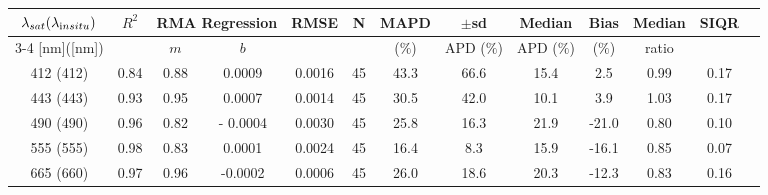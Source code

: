 \documentclass[preview]{standalone}
\begin{document}
\tiny

\tiny
\centering
\begin{tabular}{ccccccccccccc} 
 \hline 
$\lambda_{sat} (\lambda_{\text in situ})$ & $R^2$ & \multicolumn{2}{c}{RMA Regression} & RMSE & N & MAPD & $\pm$sd & Median & Bias & Median & SIQR \\ \cline{3-4}
[nm]([nm])                              &         & $m$     & $b$     &             &     & ($\%$)  & APD ($\%$)  & APD ($\%$)  & ($\%$)   & ratio   &         \\ \hline 
 412 (412) & 0.84 & 0.88 & 0.0009 & 0.0016 & 45 & 43.3 & 66.6 & 15.4 & 2.5 & 0.99 & 0.17 \\ 
 443 (443) & 0.93 & 0.95 & 0.0007 & 0.0014 & 45 & 30.5 & 42.0 & 10.1 & 3.9 & 1.03 & 0.17 \\ 
 490 (490) & 0.96 & 0.82 & - 0.0004 & 0.0030 & 45 & 25.8 & 16.3 & 21.9 & -21.0 & 0.80 & 0.10 \\ 
 555 (555) & 0.98 & 0.83 & 0.0001 & 0.0024 & 45 & 16.4 & 8.3 & 15.9 & -16.1 & 0.85 & 0.07 \\ 
 665 (660) & 0.97 & 0.96 & -0.0002 & 0.0006 & 45 & 26.0 & 18.6 & 20.3 & -12.3 & 0.83 & 0.16\\ 
\hline 
\end{tabular}
\end{document}
